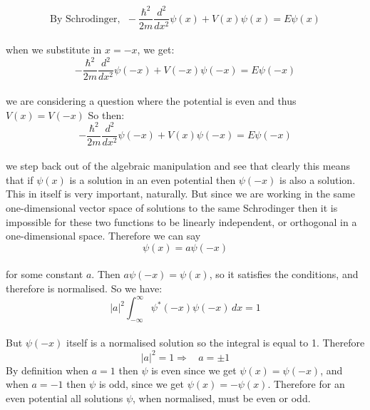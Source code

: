 \begin{enumerate}
    $$
    \text{By Schrodinger}, \:\: -{\frac{\hbar^2}{2m}\frac{d^2}{dx^2}}\psi(x)+V(x)\psi(x)=E\psi(x)
    $$
    \\
    when we substitute in $x=-x$, we get:
    $$
    -{\frac{\hbar^2}{2m}\frac{d^2}{dx^2}}\psi(-x)+V(-x)\psi(-x)=E\psi(-x)
    $$
    \\
    we are considering a question where the potential is even and thus $V(x)=V(-x)$ So then:
    $$
    -{\frac{\hbar^2}{2m}\frac{d^2}{dx^2}}\psi(-x)+V(x)\psi(-x)=E\psi(-x)
    $$
    \\
    we step back out of the algebraic manipulation and see that clearly this means that if $\psi(x)$ is a solution in an even potential then $\psi(-x)$ is also a solution. This in itself is very important, naturally. But since we are working in the same one-dimensional vector space of solutions to the same Schrodinger then it is impossible for these two functions to be linearly independent, or orthogonal in a one-dimensional space. Therefore we can say
    $$
    \psi(x)=a\psi(-x)
    $$
    \\
    for some constant $a$. Then $a\psi(-x)=\psi(x)$, so it satisfies the conditions, and therefore is normalised. So we have:
    $$
    |a|^2\int_{-\infty}^{\infty}\psi^{\ast}(-x)\psi(-x)\,dx=1
    $$
    \\
    But $\psi(-x)$ itself is a normalised solution so the integral is equal to 1. Therefore 
    $$
    |a|^2=1 \Rightarrow\:\:\:\: a=\pm1
    $$
    By definition when $a=1$ then $\psi$ is even since we get $\psi(x)=\psi(-x)$, and when $a=-1$ then $\psi$ is odd, since we get $\psi(x)=-\psi(x)$. Therefore for an even potential all solutions $\psi$, when normalised, must be even or odd.
\end{enumerate}
